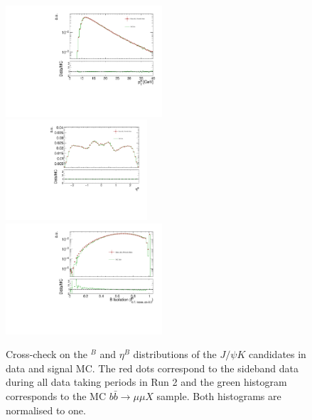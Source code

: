 \begin{figure}[!htb]
\begin{center}
\hspace*{-0.6cm}
\includegraphics[width=0.52\textwidth]{figures/InternalNote_DataMCComparison/comp/B_pT_dt_mcXs.pdf}
\hspace*{-0.3cm}
\includegraphics[width=0.47\textwidth]{figures/InternalNote_DataMCComparison/comp/B_eta_dt_mcXs.pdf}
\includegraphics[width=0.52\textwidth]{figures/InternalNote_DataMCComparison/comp/B_iso_7_Chi2_5_LoosePt05_dt_mcXs.pdf}
\caption{Cross-check on the \pt$^B$ and $\eta^B$ distributions of the $J/\psi K$ candidates in data and signal MC.
The red dots correspond to the sideband data during all data taking periods in Run 2 and the green histogram corresponds to the MC $b\bar{b} \to \mu\mu X$ sample. Both histograms are normalised to one.}
\label{fig:xcheckcont}
\end{center}
\end{figure}
%
